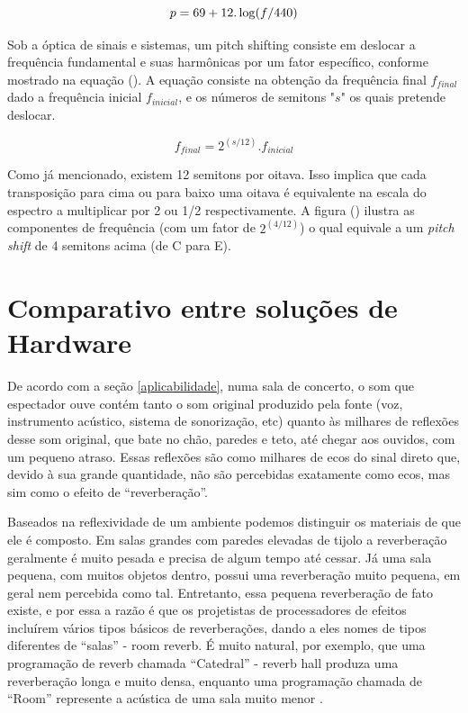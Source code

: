 			\begin{equation}
				\label{eq-escala01}
					p = 69 + 12.\log(f/440)\\
			\end{equation}

					
			Sob a óptica de sinais e sistemas, um pitch shifting consiste em deslocar a frequência fundamental e suas harmônicas por um fator específico, conforme mostrado na equação (). A equação consiste na obtenção da frequência final $f_{final}$ dado a frequência inicial $ f_{inicial} $, e os números de semitons "$ s $" os quais pretende deslocar.
			
			\begin{equation}
				\label{eq-escala02}
				f_{final} = 2^{(s/12)}.f_{inicial}
			\end{equation}
			
			Como já mencionado, existem 12 semitons por oitava. Isso implica que cada transposição para cima ou para baixo uma oitava é equivalente na escala do espectro a multiplicar por 2 ou 1/2 respectivamente. A figura () ilustra as componentes de frequência (com um fator de $2^{(4/12)}$) o qual equivale a um \textit{pitch shift} de 4 semitons acima (de C para E).
						
\section{Comparativo entre soluções de Hardware}
		
		De acordo com a seção \ref{aplicabilidade}, numa sala de concerto, o som que espectador ouve contém tanto o som original produzido pela fonte (voz, instrumento acústico, sistema de sonorização, etc) quanto às milhares de reflexões desse som original, que bate no chão, paredes e teto, até chegar aos ouvidos, com um pequeno atraso. Essas reflexões são como milhares de ecos do sinal direto que, devido à sua grande quantidade, não são percebidas exatamente como ecos, mas sim como o efeito de “reverberação”. 
		
		Baseados na reflexividade de um ambiente podemos distinguir os materiais de que ele é composto. Em salas grandes com paredes elevadas de tijolo a reverberação geralmente é muito pesada e precisa de algum tempo até cessar. Já uma sala pequena, com muitos objetos dentro, possui uma reverberação muito pequena, em geral nem percebida como tal. Entretanto, essa pequena reverberação de fato existe, e por essa a razão é que os projetistas de processadores de efeitos incluírem vários tipos básicos de reverberações, dando a eles nomes de tipos diferentes de “salas” - room reverb. É muito natural, por exemplo, que uma programação de reverb chamada “Catedral” - reverb hall produza uma reverberação longa e muito densa, enquanto uma programação chamada de “Room” represente a acústica de uma sala muito menor \cite{Albar2007}. 
		
